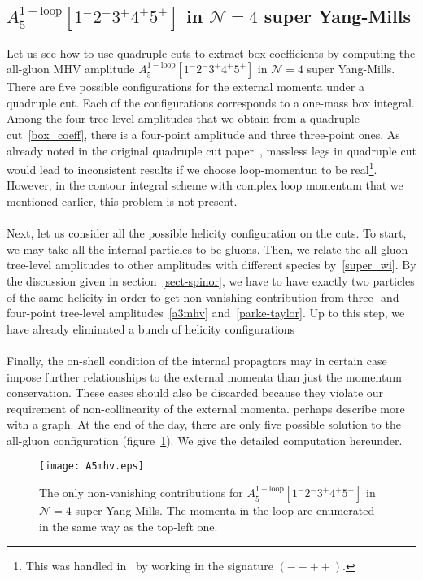 \subsection{$A_5^{\mathrm{1-loop}}[1^-2^-3^+4^+5^+]$ in $\mathcal{N}=4$ super Yang-Mills}\label{sect-a5mhv}
Let us see how to use quadruple cuts to extract box coefficients by computing the all-gluon MHV amplitude $A_5^{\mathrm{1-loop}}[1^-2^-3^+4^+5^+]$ in $\mathcal{N}=4$ super Yang-Mills. 
There are five possible configurations for the external momenta under a quadruple cut.
Each of the configurations corresponds to a one-mass box integral.
Among the four tree-level amplitudes that we obtain from a quadruple cut~\cref{box_coeff}, there is a four-point amplitude and three three-point ones.
As already noted in the original quadruple cut paper~\cite{Britto:2004nc}, massless legs in quadruple cut would lead to inconsistent results if we choose loop-momentun to be real\footnote{This was handled in~\cite{Britto:2004nc} by working in the signature $(--++)$.}. 
However, in the contour integral scheme with complex loop momentum that we mentioned earlier, this problem is not present.
\\\\
Next, let us consider all the possible helicity configuration on the cuts.
To start, we may take all the internal particles to be gluons. 
Then, we relate the all-gluon tree-level amplitudes to other amplitudes with different species by~\cref{super_wi}. 
By the discussion given in section~\ref{sect-spinor}, we have to have exactly two particles of the same helicity in order to get non-vanishing contribution from three- and four-point tree-level amplitudes~\cref{a3mhv} and~\cref{parke-taylor}.
Up to this step, we have already eliminated a bunch of helicity configurations
\\\\
Finally, the on-shell condition of the internal propagtors may in certain case impose further relationships to the external momenta than just the momentum conservation.
These cases should also be discarded because they violate our requirement of non-collinearity of the external momenta. 
\color{red}perhaps describe more with a graph.\color{black}
At the end of the day, there are only five possible solution to the all-gluon configuration (figure~\ref{fig-a5mhv}).
We give the detailed computation hereunder.
\begin{figure}
  \centering
  \texttt{[image: A5mhv.eps]}
  \caption{The only non-vanishing contributions for $A_5^{\mathrm{1-loop}}[1^-2^-3^+4^+5^+]$ in $\mathcal{N}=4$ super Yang-Mills. The momenta in the loop are enumerated in the same way as the top-left one.}
  \label{fig-a5mhv}
\end{figure}
